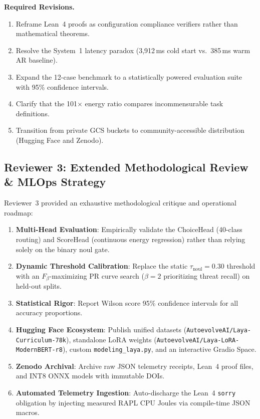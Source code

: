 \documentclass[conference]{IEEEtran}
\begin{document}
\noindent\textbf{Required Revisions.}
\begin{enumerate}
  \item Reframe Lean~4 proofs as configuration compliance verifiers rather than mathematical theorems.
  \item Resolve the System~1 latency paradox (3{,}912\,ms cold start vs.\ 385\,ms warm AR baseline).
  \item Expand the 12-case benchmark to a statistically powered evaluation suite with 95\% confidence intervals.
  \item Clarify that the 101$\times$ energy ratio compares incommensurable task definitions.
  \item Transition from private GCS buckets to community-accessible distribution (Hugging Face and Zenodo).
\end{enumerate}

\subsection{Reviewer 3: Extended Methodological Review \& MLOps Strategy}
\label{subsec:rev3}

Reviewer~3 provided an exhaustive methodological critique and operational roadmap:
\begin{enumerate}
  \item \textbf{Multi-Head Evaluation}: Empirically validate the ChoiceHead (40-class routing) and ScoreHead (continuous energy regression) rather than relying solely on the binary noul gate.
  \item \textbf{Dynamic Threshold Calibration}: Replace the static $\tau_\text{noul} = 0.30$ threshold with an $F_\beta$-maximizing PR curve search ($\beta=2$ prioritizing threat recall) on held-out splits.
  \item \textbf{Statistical Rigor}: Report Wilson score 95\% confidence intervals for all accuracy proportions.
  \item \textbf{Hugging Face Ecosystem}: Publish unified datasets (\texttt{AutoevolveAI/Laya-Curriculum-78k}), standalone LoRA weights (\texttt{AutoevolveAI/Laya-LoRA-ModernBERT-r8}), custom \texttt{modeling\_laya.py}, and an interactive Gradio Space.
  \item \textbf{Zenodo Archival}: Archive raw JSON telemetry receipts, Lean~4 proof files, and INT8 ONNX models with immutable DOIs.
  \item \textbf{Automated Telemetry Ingestion}: Auto-discharge the Lean~4 \texttt{sorry} obligation by injecting measured RAPL CPU Joules via compile-time JSON macros.
\end{enumerate}
\end{document}
